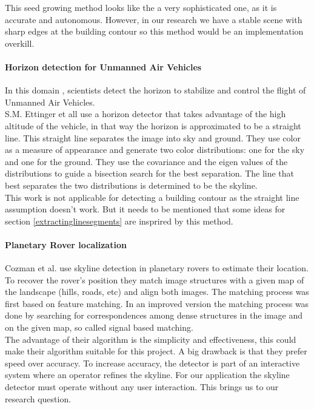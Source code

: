 This seed growing method looks like the a very sophisticated one, as it is
accurate and autonomous. However, in our research we have a stable scene with
sharp edges at the building contour so this method would be an implementation
overkill. 


\paragraph{Horizon detection for Unmanned Air Vehicles}
In this domain \cite{Guidedflight}, scientists detect the horizon to stabilize and control the
flight of Unmanned Air Vehicles.\\  
S.M. Ettinger et all \cite{Guidedflight} use a horizon detector that takes
advantage of the high altitude of the vehicle, in that way the horizon is
approximated to be a straight line. 
This straight line separates the image into sky and ground. They use color as
a measure of appearance and generate two color distributions: one for the sky
and one for the ground. They use the covariance and the eigen values of the
distributions to guide a bisection search for the best separation. The line that
best separates the two distributions is determined to be the skyline.\\

This work is not applicable for detecting a building contour as the straight
line assumption doesn't work. But it needs to be mentioned that some ideas for
section \ref{extractinglinesegments} are insprired by this method.

\paragraph{Planetary Rover localization}
Cozman et al. \cite{Rover} use skyline detection in planetary rovers to estimate 
their location. 
To recover the rover's position they match image structures with a given map
of the landscape (hills, roads, etc) and align both images.
The matching process was first based on feature matching. In an improved version
the matching process was done by searching for correspondences among dense
structures in the image and on the given map, so called signal based matching.\\
The advantage of their algorithm is the simplicity and effectiveness, this
could make their algorithm suitable for this project. A big drawback is that
they prefer speed over accuracy. To increase accuracy, the detector is part
of an interactive system where an operator refines the skyline. For our
application the skyline detector must operate without any user interaction.
This brings us to our research question.

